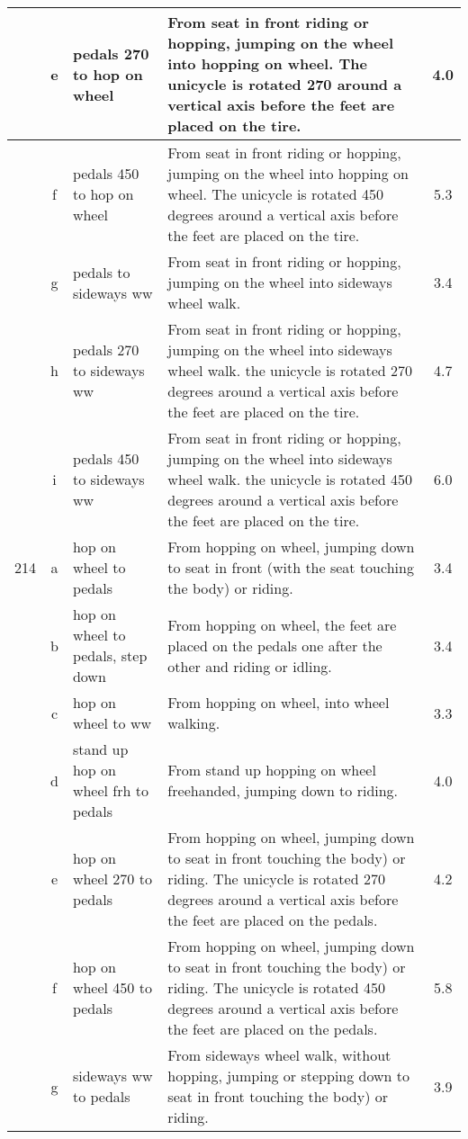 \begin{longtable}{|r|c|p{4cm}|p{8cm}|c|}
\hline
  & e & pedals 270 to hop on wheel  & From seat in front riding or hopping, jumping on the wheel into hopping on wheel. The unicycle is rotated 270 around a vertical axis before the feet are placed on the tire.  & 4.0 \\ 
\hline
  & f & pedals 450 to hop on wheel  & From seat in front riding or hopping, jumping on the wheel into hopping on wheel. The unicycle is rotated 450 degrees around a vertical axis before the feet are placed on the tire.  & 5.3 \\ 
\hline
  & g & pedals to sideways ww & From seat in front riding or hopping, jumping on the wheel into sideways wheel walk.  & 3.4 \\ 
\hline
  & h & pedals 270 to sideways ww & From seat in front riding or hopping, jumping on the wheel into sideways wheel walk. the unicycle is rotated 270 degrees around a vertical axis before the feet are placed on the tire. & 4.7 \\ 
\hline
  & i & pedals 450 to sideways ww & From seat in front riding or hopping, jumping on the wheel into sideways wheel walk. the unicycle is rotated 450 degrees around a vertical axis before the feet are placed on the tire. & 6.0 \\ 
\hline
214 & a & hop on wheel to pedals  & From hopping on wheel, jumping down to seat in front (with the seat touching the body) or riding. & 3.4 \\ 
\hline
  & b & hop on wheel to pedals, step down & From hopping on wheel, the feet are placed on the pedals one after the other and riding or idling.  & 3.4 \\ 
\hline
  & c & hop on wheel to ww  & From hopping on wheel, into wheel walking.  & 3.3 \\ 
\hline
  & d & stand up hop on wheel frh to pedals & From stand up hopping on wheel freehanded, jumping down to riding.  & 4.0 \\ 
\hline
  & e & hop on wheel 270 to pedals  & From hopping on wheel, jumping down to seat in front touching the body) or riding. The unicycle is rotated 270 degrees around a vertical axis before the feet are placed on the pedals. & 4.2 \\ 
\hline
  & f & hop on wheel 450 to pedals  & From hopping on wheel, jumping down to seat in front touching the body) or riding. The unicycle is rotated 450 degrees around a vertical axis before the feet are placed on the pedals. & 5.8 \\ 
\hline
  & g & sideways ww to pedals & From sideways wheel walk, without hopping, jumping or stepping down to seat in front touching the body) or riding.  & 3.9 \\ 

\end{longtable}
